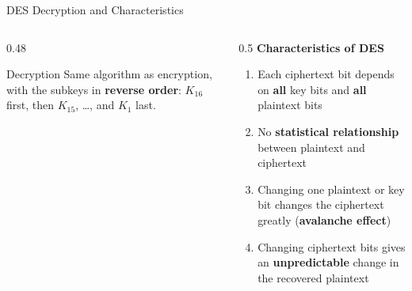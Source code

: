 \documentclass[aspectratio=169,11pt,xcolor={table}]{beamer}
\begin{document}
\begin{frame}{DES Decryption and Characteristics}
  \begin{columns}[T]
    \begin{column}{0.48\textwidth}
      \begin{block}{Decryption}
        \small Same algorithm as encryption, with the subkeys in \textbf{reverse order}: $K_{16}$ first, then $K_{15}$, \dots, and $K_1$ last.
      \end{block}
      \centering
    \end{column}
    \begin{column}{0.5\textwidth}
      \textbf{Characteristics of DES}
      \begin{enumerate}\small\setlength{\itemsep}{3pt}
        \item Each ciphertext bit depends on \textbf{all} key bits and \textbf{all} plaintext bits
        \item No \textbf{statistical relationship} between plaintext and ciphertext
        \item Changing one plaintext or key bit changes the ciphertext greatly (\textbf{avalanche effect})
        \item Changing ciphertext bits gives an \textbf{unpredictable} change in the recovered plaintext
      \end{enumerate}
    \end{column}
  \end{columns}
\end{frame}
\end{document}

